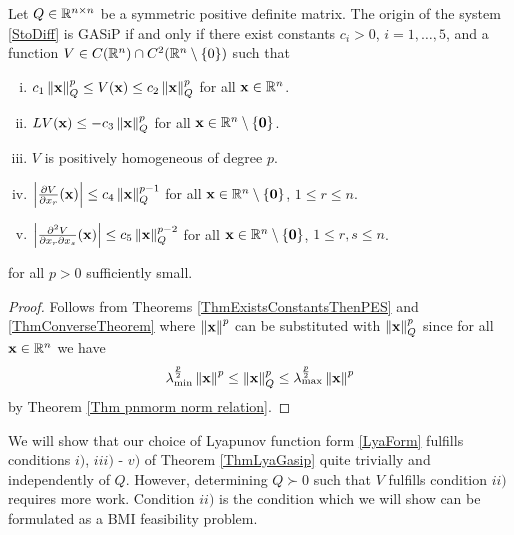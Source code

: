 \documentclass[a4paper,12pt,twoside,BCOR=10mm]{scrbook}
\begin{document}
\begin{theorem}\label{ThmLyaGasip}
Let $Q\in \mathbb{R}^{n\times n}$ be a symmetric positive definite matrix. The origin of the system \eqref{StoDiff} is GASiP if and only if there exist constants $c_i > 0$, $i = 1,\ldots, 5$, and a function $V \in C(\mathbb{R}^{n}) \cap C^2(\mathbb{R}^{n} \setminus \{0\})$ such that
\begin{enumerate}[i)]
    \item $c_1 \left\lVert\mathbf{x}\right\rVert_Q^p \leq V(\mathbf{x}) \leq c_2 \left\lVert\mathbf{x}\right\rVert_Q^p$ for all $\mathbf{x} \in \mathbb{R}^{n}$.
    \item $LV(\mathbf{x}) \leq -c_3\left\lVert\mathbf{x}\right\rVert_Q^p$ for all $\mathbf{x} \in \mathbb{R}^{n} \setminus \{\mathbf{0}\}$.
    \item $V$ is positively homogeneous of degree $p$.
    \item $\left\lvert \frac{\partial V}{\partial x_r}(\mathbf{x})\right\rvert \leq c_4 \left\lVert\mathbf{x}\right\rVert_{Q}^{p-1}$ for all $\mathbf{x} \in \mathbb{R}^{n} \setminus \{\mathbf{0}\}$, $1 \leq r \leq n$.
    \item $\left\lvert \frac{\partial ^2 V}{\partial x_r \partial x_s}(\mathbf{x}) \right\rvert \leq c_5 \left\lVert\mathbf{x}\right\rVert_{Q}^{p-2}$ for all $\mathbf{x} \in \mathbb{R}^{n} \setminus \{\mathbf{0}\}$, $1 \leq r,s \leq n$.
\end{enumerate}
for all $p > 0$ sufficiently small.
\end{theorem}
\begin{proof}
Follows from Theorems \ref{ThmExistsConstantsThenPES} and \ref{ThmConverseTheorem} where $\left\lVert\mathbf{x}\right\rVert^p$ can be substituted with $\left\lVert\mathbf{x}\right\rVert_Q^p$ since for all $\mathbf{x} \in \mathbb{R}^{n}$ we have
\begin{align*}
    \lambda_{\min}^\frac{p}{2}\left\lVert\mathbf{x}\right\rVert^p \leq \left\lVert\mathbf{x}\right\rVert_Q^p \leq \lambda_{\max}^\frac{p}{2}\left\lVert\mathbf{x}\right\rVert^p
\end{align*}
by Theorem \ref{Thm pnmorm norm relation}.
\end{proof}

We will show that our choice of Lyapunov function form \eqref{LyaForm} fulfills conditions $i)$, $iii)$ - $v)$ of Theorem \ref{ThmLyaGasip} quite trivially and independently of $Q$. However, determining $Q \succ 0$ such that $V$ fulfills condition $ii)$ requires more work. Condition $ii)$ is the condition which we will show can be formulated as a BMI feasibility problem.
\end{document}
